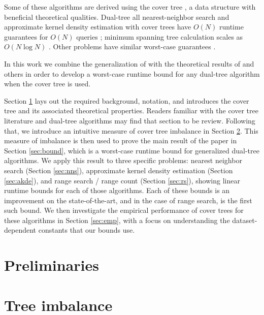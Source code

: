 \documentclass[twoside,11pt]{article} %
\begin{document}
Some of these algorithms are derived using the cover tree \citep{langford2006}, a
data structure with beneficial theoretical qualities.  Dual-tree all
nearest-neighbor search and approximate kernel density estimation with cover
trees have $O(N)$ runtime guarantees for $O(N)$ queries \citep{ram2009}; minimum
spanning tree calculation scales as $O(N \log N)$ \citep{march2010euclidean}.
Other problems have similar worst-case guarantees \citep{curtin2014dual,
march2013multi}.

In this work we combine the generalization of \citet{curtin2013tree} with the
theoretical results of \citet{langford2006} and others in order to develop a
worst-case runtime bound for any dual-tree algorithm when the cover tree is
used.

Section \ref{sec:preliminaries} lays out the required background, notation, and
introduces the cover tree and its associated theoretical properties.  Readers
familiar with the cover tree literature and dual-tree algorithms
\citep[especially][]{curtin2013tree} may find that section to be review.
Following that, we introduce an intuitive measure of cover tree imbalance in
Section \ref{sec:imbalance}.  This measure of imbalance is then used to prove
the main result of the paper in Section \ref{sec:bound}, which is a worst-case
runtime bound for generalized dual-tree algorithms.  We apply this result to
three specific problems: nearest neighbor search (Section \ref{sec:nns}),
approximate kernel density estimation (Section \ref{sec:akde}), and range search
/ range count (Section \ref{sec:rs}), showing linear runtime bounds for each of
those algorithms.  Each of these bounds is an improvement on the
state-of-the-art, and in the case of range search, is the first such bound.  We
then investigate the empirical performance of cover trees for these algorithms
in Section \ref{sec:emp}, with a focus on understanding the dataset-dependent
constants that our bounds use.

\section{Preliminaries}
\label{sec:preliminaries}



\section{Tree imbalance}
\label{sec:imbalance}
\end{document}
